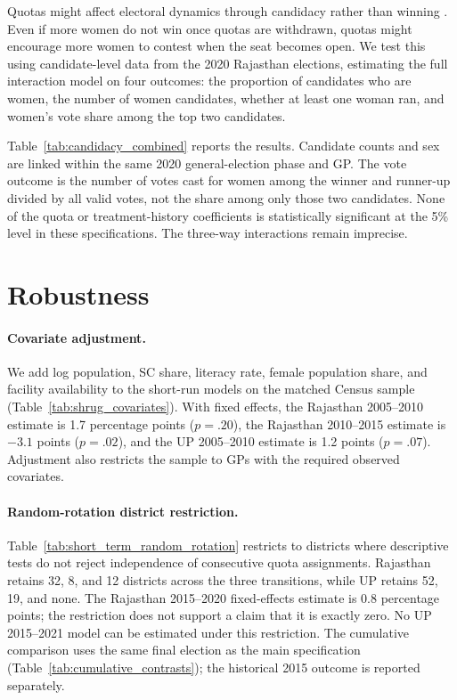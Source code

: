\documentclass[12pt]{article}
\begin{document}
Quotas might affect electoral dynamics through candidacy rather than winning \citep{o2020can, auerbach2016electoral}. Even if more women do not win once quotas are withdrawn, quotas might encourage more women to contest when the seat becomes open. We test this using candidate-level data from the 2020 Rajasthan elections, estimating the full interaction model on four outcomes: the proportion of candidates who are women, the number of women candidates, whether at least one woman ran, and women's vote share among the top two candidates.

Table~\ref{tab:candidacy_combined} reports the results. Candidate counts and sex are linked within the same 2020 general-election phase and GP. The vote outcome is the number of votes cast for women among the winner and runner-up divided by all valid votes, not the share among only those two candidates. None of the quota or treatment-history coefficients is statistically significant at the 5\% level in these specifications. The three-way interactions remain imprecise.

\section{Robustness}\label{sec:robustness}

\paragraph{Covariate adjustment.} We add log population, SC share, literacy rate, female population share, and facility availability to the short-run models on the matched Census sample (Table~\ref{tab:shrug_covariates}). With fixed effects, the Rajasthan 2005--2010 estimate is 1.7 percentage points ($p=.20$), the Rajasthan 2010--2015 estimate is $-3.1$ points ($p=.02$), and the UP 2005--2010 estimate is 1.2 points ($p=.07$). Adjustment also restricts the sample to GPs with the required observed covariates.

\paragraph{Random-rotation district restriction.} Table~\ref{tab:short_term_random_rotation} restricts to districts where descriptive tests do not reject independence of consecutive quota assignments. Rajasthan retains 32, 8, and 12 districts across the three transitions, while UP retains 52, 19, and none. The Rajasthan 2015--2020 fixed-effects estimate is 0.8 percentage points; the restriction does not support a claim that it is exactly zero. No UP 2015--2021 model can be estimated under this restriction. The cumulative comparison uses the same final election as the main specification (Table~\ref{tab:cumulative_contrasts}); the historical 2015 outcome is reported separately.
\end{document}
